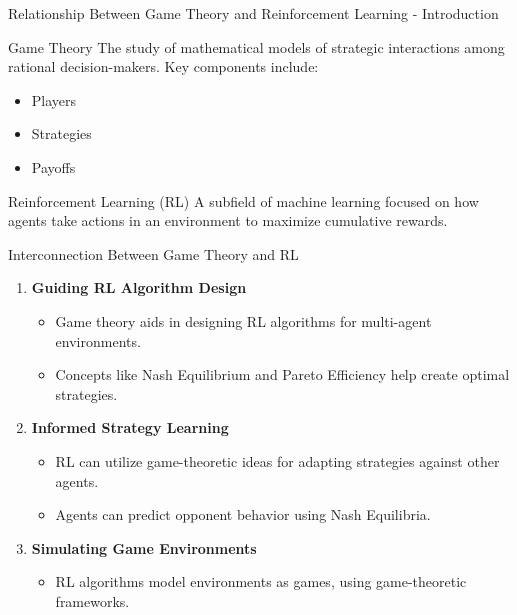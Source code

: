 \documentclass[aspectratio=169]{beamer}
\begin{document}
\begin{frame}[fragile]{Relationship Between Game Theory and Reinforcement Learning - Introduction}
    \begin{block}{Game Theory}
        The study of mathematical models of strategic interactions among rational decision-makers. 
        Key components include:
        \begin{itemize}
            \item Players
            \item Strategies
            \item Payoffs
        \end{itemize}
    \end{block}
    
    \begin{block}{Reinforcement Learning (RL)}
        A subfield of machine learning focused on how agents take actions in an environment to maximize cumulative rewards.
    \end{block}
\end{frame}

\begin{frame}[fragile]{Interconnection Between Game Theory and RL}
    \begin{enumerate}
        \item \textbf{Guiding RL Algorithm Design}
            \begin{itemize}
                \item Game theory aids in designing RL algorithms for multi-agent environments.
                \item Concepts like Nash Equilibrium and Pareto Efficiency help create optimal strategies.
            \end{itemize}
        \item \textbf{Informed Strategy Learning}
            \begin{itemize}
                \item RL can utilize game-theoretic ideas for adapting strategies against other agents.
                \item Agents can predict opponent behavior using Nash Equilibria.
            \end{itemize}
        \item \textbf{Simulating Game Environments}
            \begin{itemize}
                \item RL algorithms model environments as games, using game-theoretic frameworks.
            \end{itemize}
    \end{enumerate}
\end{frame}
\end{document}
